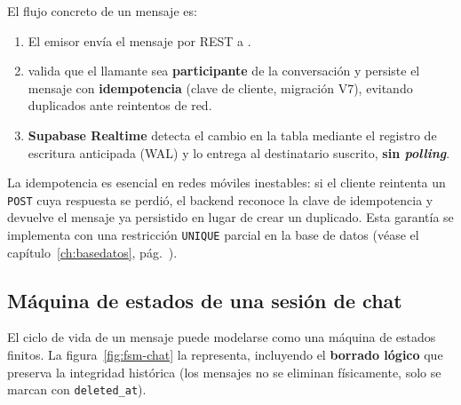 El flujo concreto de un mensaje es:

\begin{enumerate}[noitemsep]
    \item El emisor envía el mensaje por REST a .
    \item {} valida que el llamante sea \textbf{participante} de la
    conversación y persiste el mensaje con \textbf{idempotencia} (clave de cliente,
    migración V7), evitando duplicados ante reintentos de red.
    \item \textbf{Supabase Realtime} detecta el cambio en la tabla mediante el registro
    de escritura anticipada (WAL) y lo entrega al destinatario suscrito, \textbf{sin
    \textit{polling}}.
\end{enumerate}

\begin{NotaTecnica}
La idempotencia es esencial en redes móviles inestables: si el cliente reintenta un
\texttt{POST} cuya respuesta se perdió, el backend reconoce la clave de idempotencia y
devuelve el mensaje ya persistido en lugar de crear un duplicado. Esta garantía se
implementa con una restricción \texttt{UNIQUE} parcial en la base de datos
(véase el capítulo~\ref{ch:basedatos}, pág.~\pageref{ch:basedatos}).
\end{NotaTecnica}

\subsection{Máquina de estados de una sesión de chat}
\label{subsec:rt_estados}

El ciclo de vida de un mensaje puede modelarse como una máquina de estados finitos. La
figura~\ref{fig:fsm-chat} la representa, incluyendo el \textbf{borrado lógico} que
preserva la integridad histórica (los mensajes no se eliminan físicamente, solo se marcan
con \texttt{deleted\_at}).

